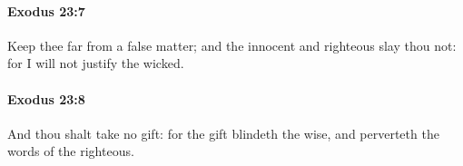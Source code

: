 		\paragraph{Exodus 23:7} %
			\label{EXODUS-23-7}

			Keep thee far from a false matter; and the innocent and righteous slay thou not: for I will not justify the wicked.


		\paragraph{Exodus 23:8} %
			\label{EXODUS-23-8}

			And thou shalt take no gift: for the gift blindeth the wise, and perverteth the words of the righteous.


